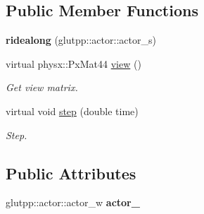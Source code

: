 \subsection*{\-Public \-Member \-Functions}
\begin{DoxyCompactItemize}
\item 
\hypertarget{classglutpp_1_1Camera_1_1View_1_1ridealong_ae6b8552cf2fc6ca0892276225f367483}{{\bfseries ridealong} (glutpp\-::actor\-::actor\-\_\-s)}\label{classglutpp_1_1Camera_1_1View_1_1ridealong_ae6b8552cf2fc6ca0892276225f367483}

\item 
\hypertarget{classglutpp_1_1Camera_1_1View_1_1ridealong_a4ee5eeec5dffa25ddf28d8cfc89a35c8}{virtual physx\-::\-Px\-Mat44 \hyperlink{classglutpp_1_1Camera_1_1View_1_1ridealong_a4ee5eeec5dffa25ddf28d8cfc89a35c8}{view} ()}\label{classglutpp_1_1Camera_1_1View_1_1ridealong_a4ee5eeec5dffa25ddf28d8cfc89a35c8}

\begin{DoxyCompactList}\small\item\em \-Get view matrix. \end{DoxyCompactList}\item 
virtual void \hyperlink{classglutpp_1_1Camera_1_1View_1_1ridealong_a4ab29cdafb2d4ba835485f47d41ae2b6}{step} (double time)
\begin{DoxyCompactList}\small\item\em \-Step. \end{DoxyCompactList}\end{DoxyCompactItemize}
\subsection*{\-Public \-Attributes}
\begin{DoxyCompactItemize}
\item 
\hypertarget{classglutpp_1_1Camera_1_1View_1_1ridealong_abf4b639b7731da7c44d2b4b6625c89b9}{glutpp\-::actor\-::actor\-\_\-w {\bfseries actor\-\_\-}}\label{classglutpp_1_1Camera_1_1View_1_1ridealong_abf4b639b7731da7c44d2b4b6625c89b9}

\end{DoxyCompactItemize}


